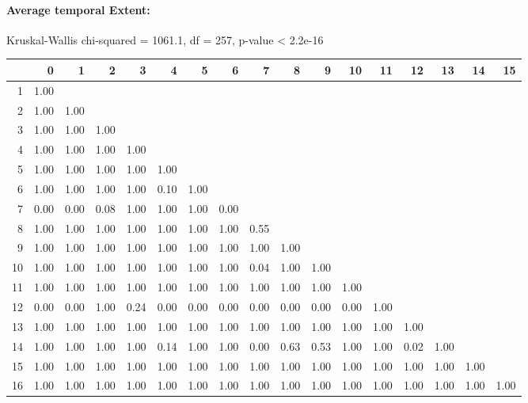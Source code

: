 \paragraph{Average temporal Extent:}
Kruskal-Wallis chi-squared = 1061.1, df = 257, p-value < 2.2e-16

% 
\begin{tabular}{rrrrrrrrrrrrrrrrr}
  \hline
 & 0 & 1 & 2 & 3 & 4 & 5 & 6 & 7 & 8 & 9 & 10 & 11 & 12 & 13 & 14 & 15 \\ 
  \hline
1 & 1.00 &  &  &  &  &  &  &  &  &  &  &  &  &  &  &  \\ 
  2 & 1.00 & 1.00 &  &  &  &  &  &  &  &  &  &  &  &  &  &  \\ 
  3 & 1.00 & 1.00 & 1.00 &  &  &  &  &  &  &  &  &  &  &  &  &  \\ 
  4 & 1.00 & 1.00 & 1.00 & 1.00 &  &  &  &  &  &  &  &  &  &  &  &  \\ 
  5 & 1.00 & 1.00 & 1.00 & 1.00 & 1.00 &  &  &  &  &  &  &  &  &  &  &  \\ 
  6 & 1.00 & 1.00 & 1.00 & 1.00 & 0.10 & 1.00 &  &  &  &  &  &  &  &  &  &  \\ 
  7 & 0.00 & 0.00 & 0.08 & 1.00 & 1.00 & 1.00 & 0.00 &  &  &  &  &  &  &  &  &  \\ 
  8 & 1.00 & 1.00 & 1.00 & 1.00 & 1.00 & 1.00 & 1.00 & 0.55 &  &  &  &  &  &  &  &  \\ 
  9 & 1.00 & 1.00 & 1.00 & 1.00 & 1.00 & 1.00 & 1.00 & 1.00 & 1.00 &  &  &  &  &  &  &  \\ 
  10 & 1.00 & 1.00 & 1.00 & 1.00 & 1.00 & 1.00 & 1.00 & 0.04 & 1.00 & 1.00 &  &  &  &  &  &  \\ 
  11 & 1.00 & 1.00 & 1.00 & 1.00 & 1.00 & 1.00 & 1.00 & 1.00 & 1.00 & 1.00 & 1.00 &  &  &  &  &  \\ 
  12 & 0.00 & 0.00 & 1.00 & 0.24 & 0.00 & 0.00 & 0.00 & 0.00 & 0.00 & 0.00 & 0.00 & 1.00 &  &  &  &  \\ 
  13 & 1.00 & 1.00 & 1.00 & 1.00 & 1.00 & 1.00 & 1.00 & 1.00 & 1.00 & 1.00 & 1.00 & 1.00 & 1.00 &  &  &  \\ 
  14 & 1.00 & 1.00 & 1.00 & 1.00 & 0.14 & 1.00 & 1.00 & 0.00 & 0.63 & 0.53 & 1.00 & 1.00 & 0.02 & 1.00 &  &  \\ 
  15 & 1.00 & 1.00 & 1.00 & 1.00 & 1.00 & 1.00 & 1.00 & 1.00 & 1.00 & 1.00 & 1.00 & 1.00 & 1.00 & 1.00 & 1.00 &  \\ 
  16 & 1.00 & 1.00 & 1.00 & 1.00 & 1.00 & 1.00 & 1.00 & 1.00 & 1.00 & 1.00 & 1.00 & 1.00 & 1.00 & 1.00 & 1.00 & 1.00 \\ 
   \hline
\end{tabular}
